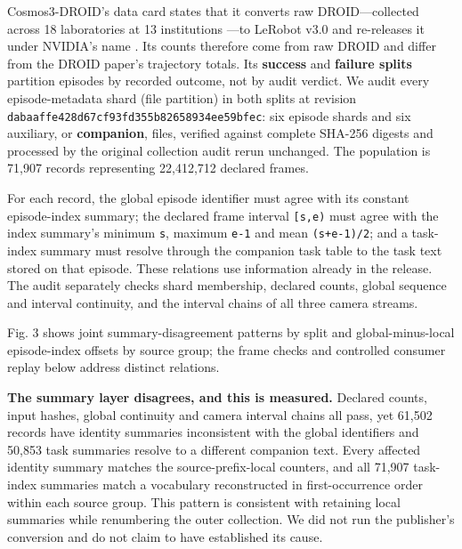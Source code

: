 \documentclass[conference]{IEEEtran}
\begin{document}
Cosmos3-DROID's data card states that it converts raw DROID---collected across 18 laboratories at 13 institutions \cite{22}---to LeRobot v3.0 and re-releases it under NVIDIA's name \cite{21}. Its counts therefore come from raw DROID and differ from the DROID paper's trajectory totals. Its \textbf{success} and \textbf{failure splits} partition episodes by recorded outcome, not by audit verdict. We audit every episode-metadata shard (file partition) in both splits at revision \texttt{dabaaffe428d\allowbreak{}67cf93fd355b\allowbreak{}82658934ee59\allowbreak{}bfec}: six episode shards and six auxiliary, or \textbf{companion}, files, verified against complete SHA-256 digests and processed by the original collection audit rerun unchanged. The population is 71,907 records representing 22,412,712 declared frames.\par

For each record, the global episode identifier must agree with its constant episode-index summary; the declared frame interval \texttt{[s,e)} must agree with the index summary's minimum \texttt{s}, maximum \texttt{e-1} and mean \texttt{(s+e-1)/\allowbreak{}2}; and a task-index summary must resolve through the companion task table to the task text stored on that episode. These relations use information already in the release. The audit separately checks shard membership, declared counts, global sequence and interval continuity, and the interval chains of all three camera streams.\par



Fig. 3 shows joint summary-disagreement patterns by split and global-minus-local episode-index offsets by source group; the frame checks and controlled consumer replay below address distinct relations.\par

\textbf{The summary layer disagrees, and this is measured.} Declared counts, input hashes, global continuity and camera interval chains all pass, yet 61,502 records have identity summaries inconsistent with the global identifiers and 50,853 task summaries resolve to a different companion text. Every affected identity summary matches the source-prefix-local counters, and all 71,907 task-index summaries match a vocabulary reconstructed in first-occurrence order within each source group. This pattern is consistent with retaining local summaries while renumbering the outer collection. We did not run the publisher's conversion and do not claim to have established its cause.\par
\end{document}
